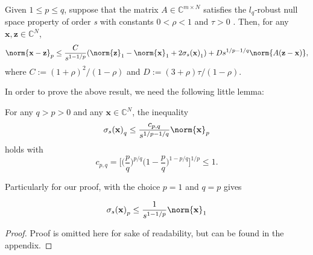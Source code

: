  



\begin{tcolorbox}[colback=yellow,colframe=white]
\begin{theorem}
Given $1 \leq p \leq q$, suppose that the matrix $A \in \mathbb{C}^{m \times N}$ satisfies the $l_q$-robust null space property of order \emph{s} with constants $0 < \rho < 1$ and $ \tau > 0$ . Then, for any $\mathbf{x}, \mathbf{z} \in \mathbb{C}^{N}$, 
\begin{equation*}
\norm{\mathbf{x-z}}_{p} \leq \frac{C}{s^{1-1/p}}(\norm{\mathbf{z}}_1-\norm{\mathbf{x}}_1+2\sigma_s \mathbf{(x)}_1) + Ds^{1/p-1/q}\norm{A(\mathbf{z-x})}, 
\end{equation*}
where $C:=(1+\rho)^2/(1-\rho)$ and $D:=(3+\rho)\tau/(1-\rho)$.
\end{theorem}
\end{tcolorbox}

In order to prove the above result, we need the following little lemma:

\begin{tcolorbox}[colback=green,colframe=white]
\begin{lemma}
For any $q > p > 0 $ and any $\mathbf{x} \in \mathbb{C}^N$, the inequality 
\begin{equation*}
\sigma_s \mathbf{(x)}_q \leq \frac{c_{p,q}}{s^{1/p-1/q}}\norm{\mathbf{x}}_p
\end{equation*}
holds with
\begin{equation*}
c_{p,q} = \Big[\Big(\frac{p}{q}\Big)^{p/q}\Big(1-\frac{p}{q}\Big)^{1-p/q}\Big]^{1/p} \leq 1.
\end{equation*}

Particularly for our proof, with the choice $p = 1$ and $q = p$ gives

\begin{equation*}
\sigma_s \mathbf{(x)}_p \leq \frac{1}{s^{1-1/p}}\norm{\mathbf{x}}_1
\end{equation*}


\end{lemma}
\end{tcolorbox}
\begin{proof}
Proof is omitted here for sake of readability, but can be found in the appendix.
\end{proof}


